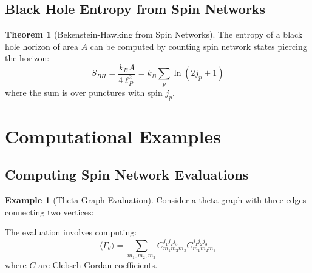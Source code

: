 \documentclass[12pt,a4paper]{article}
\theoremstyle{definition}
\newtheorem{theorem}{Theorem}[section]
\newtheorem{example}{Example}[section]
\begin{document}
\subsection{Black Hole Entropy from Spin Networks}

\begin{theorem}[Bekenstein-Hawking from Spin Networks]
The entropy of a black hole horizon of area $A$ can be computed by counting spin network states piercing the horizon:
\begin{equation}
S_{BH} = \frac{k_B A}{4\ell_P^2} = k_B \sum_p \ln\left(2j_p + 1\right)
\end{equation}
where the sum is over punctures with spin $j_p$.
\end{theorem}

\section{Computational Examples}

\subsection{Computing Spin Network Evaluations}

\begin{example}[Theta Graph Evaluation]
Consider a theta graph with three edges connecting two vertices:

\begin{center}
\end{center}

The evaluation involves computing:
\begin{equation}
\langle \Gamma_\theta \rangle = \sum_{m_1,m_2,m_3} C^{j_1 j_2 j_3}_{m_1 m_2 m_3} C^{j_1 j_2 j_3}_{m_1 m_2 m_3}
\end{equation}
where $C$ are Clebsch-Gordan coefficients.
\end{example}
\end{document}
